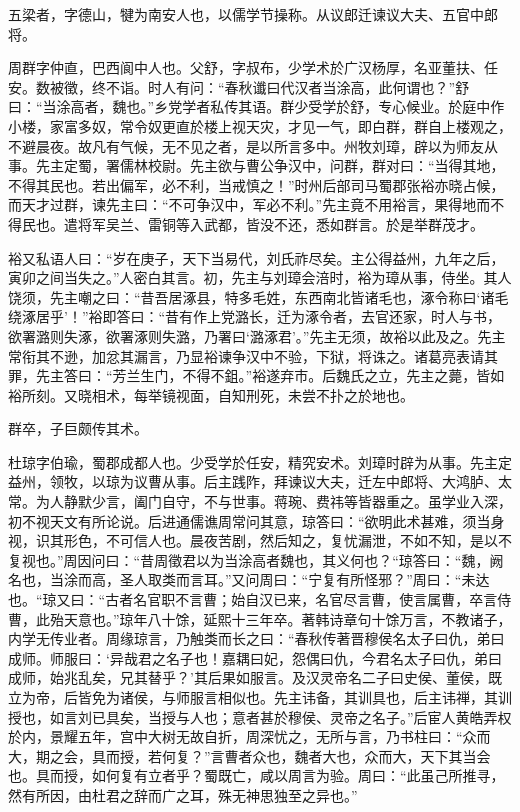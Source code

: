 \documentclass[12pt,UTF8]{ctexbook}
\begin{document}
五梁者，字德山，犍为南安人也，以儒学节操称。从议郎迁谏议大夫、五官中郎将。

周群字仲直，巴西阆中人也。父舒，字叔布，少学术於广汉杨厚，名亚董扶、任安。数被徵，终不诣。时人有问：“春秋谶曰代汉者当涂高，此何谓也？”舒曰：“当涂高者，魏也。”乡党学者私传其语。群少受学於舒，专心候业。於庭中作小楼，家富多奴，常令奴更直於楼上视天灾，才见一气，即白群，群自上楼观之，不避晨夜。故凡有气候，无不见之者，是以所言多中。州牧刘璋，辟以为师友从事。先主定蜀，署儒林校尉。先主欲与曹公争汉中，问群，群对曰：“当得其地，不得其民也。若出偏军，必不利，当戒慎之！”时州后部司马蜀郡张裕亦晓占候，而天才过群，谏先主曰：“不可争汉中，军必不利。”先主竟不用裕言，果得地而不得民也。遣将军吴兰、雷铜等入武都，皆没不还，悉如群言。於是举群茂才。

裕又私语人曰：“岁在庚子，天下当易代，刘氏祚尽矣。主公得益州，九年之后，寅卯之间当失之。”人密白其言。初，先主与刘璋会涪时，裕为璋从事，侍坐。其人饶须，先主嘲之曰：“昔吾居涿县，特多毛姓，东西南北皆诸毛也，涿令称曰‘诸毛绕涿居乎’！”裕即答曰：“昔有作上党潞长，迁为涿令者，去官还家，时人与书，欲署潞则失涿，欲署涿则失潞，乃署曰‘潞涿君’。”先主无须，故裕以此及之。先主常衔其不逊，加忿其漏言，乃显裕谏争汉中不验，下狱，将诛之。诸葛亮表请其罪，先主答曰：“芳兰生门，不得不鉏。”裕遂弃市。后魏氏之立，先主之薨，皆如裕所刻。又晓相术，每举镜视面，自知刑死，未尝不扑之於地也。

群卒，子巨颇传其术。

杜琼字伯瑜，蜀郡成都人也。少受学於任安，精究安术。刘璋时辟为从事。先主定益州，领牧，以琼为议曹从事。后主践阼，拜谏议大夫，迁左中郎将、大鸿胪、太常。为人静默少言，阖门自守，不与世事。蒋琬、费祎等皆器重之。虽学业入深，初不视天文有所论说。后进通儒谯周常问其意，琼答曰：“欲明此术甚难，须当身视，识其形色，不可信人也。晨夜苦剧，然后知之，复忧漏泄，不如不知，是以不复视也。”周因问曰：“昔周徵君以为当涂高者魏也，其义何也？“琼答曰：“魏，阙名也，当涂而高，圣人取类而言耳。”又问周曰：“宁复有所怪邪？”周曰：“未达也。“琼又曰：“古者名官职不言曹；始自汉已来，名官尽言曹，使言属曹，卒言侍曹，此殆天意也。”琼年八十馀，延熙十三年卒。著韩诗章句十馀万言，不教诸子，内学无传业者。周缘琼言，乃触类而长之曰：“春秋传著晋穆侯名太子曰仇，弟曰成师。师服曰：‘异哉君之名子也！嘉耦曰妃，怨偶曰仇，今君名太子曰仇，弟曰成师，始兆乱矣，兄其替乎？’其后果如服言。及汉灵帝名二子曰史侯、董侯，既立为帝，后皆免为诸侯，与师服言相似也。先主讳备，其训具也，后主讳禅，其训授也，如言刘已具矣，当授与人也；意者甚於穆侯、灵帝之名子。”后宦人黄皓弄权於内，景耀五年，宫中大树无故自折，周深忧之，无所与言，乃书柱曰：“众而大，期之会，具而授，若何复？”言曹者众也，魏者大也，众而大，天下其当会也。具而授，如何复有立者乎？蜀既亡，咸以周言为验。周曰：“此虽己所推寻，然有所因，由杜君之辞而广之耳，殊无神思独至之异也。”
\end{document}
